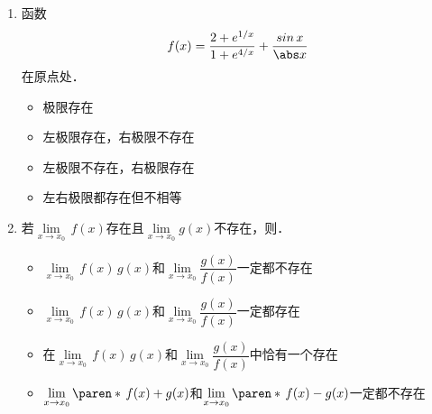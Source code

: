 \documentclass[a4paper,punct=CCT]{ctexbook}
\renewcommand*{\siand}{\shortintertext{和}}
\theoremstyle{definition}
\theoremstyle{remark}
\newif\ifshowsol
\begin{document}
\begin{enumerate}
\item 函数
  \begin{equation*}
    f(x) = \frac{2+e^{1/x}}{1+e^{4/x}} + \frac{\sin x}{\abs x}
  \end{equation*}
  在原点处\uline{\makebox[6em]{}}．
  \begin{itemize}
    \renewcommand{\labelitemi}{\faCircleThin}
    \ifshowsol
  \item[\faCircle]
    \else
  \item
    \fi
    极限存在
  \item 左极限存在，右极限不存在
  \item 左极限不存在，右极限存在
  \item 左右极限都存在但不相等
  \end{itemize}

  \ifshowsol
  实际上，有
  \begin{gather*}
    \lim_{\,x\to0^+} \,f(x)
    = {}\smashoperator[l]{\lim_{\,x\to0^+}} \paren[\bigg]{\frac{2/e^{1/x} + 1}{1/e^{1/x} + e^{3/x}} + \frac{\sin x}{x}}
    = 1
    \siand
    \lim_{\,x\to0^-} \,f(x)
    = {}\smashoperator[l]{\lim_{\,x\to0^-}} \paren[\bigg]{\frac{2+e^{1/x}}{1+e^{4/x}} - \frac{\sin x}{x}}
    = 1.
  \end{gather*}
  所以函数\(f\)在原点处的极限是\(1\)．
  \fi

\item 若\(\lim\limits_{x \to x_0} \,f(x)\)存在且\(\lim\limits_{x \to x_0} g(x)\)不存在，则\uline{\makebox[10em]{}}．
  \begin{itemize}[itemsep=1ex]
    \renewcommand{\labelitemi}{\faCircleThin}
  \item \(\lim\limits_{x \to x_0} \,f(x)\,g(x)\)和\(\lim\limits_{x \to x_0} \dfrac{g(x)}{f(x)}\)一定都不存在
  \item \(\lim\limits_{x \to x_0} \,f(x)\,g(x)\)和\(\lim\limits_{x \to x_0} \dfrac{g(x)}{f(x)}\)一定都存在
  \item 在\(\lim\limits_{x \to x_0} \,f(x)\,g(x)\)和\(\lim\limits_{x \to x_0} \dfrac{g(x)}{f(x)}\)中恰有一个存在
    \ifshowsol
  \item[\faCircle]
    \else
  \item
    \fi
    \(\lim\limits_{x \to x_0} \paren*{\,f(x)+g(x)}\)和\(\lim\limits_{x \to x_0} \paren*{\,f(x)-g(x)}\)一定都不存在
  \end{itemize}

  \ifshowsol
  令\(f(x) = x\)和\(g(x) = 1/x\)，可以证伪选项~A和~B．在此基础上，令\(g(x) = 1/x^2\)，可以证伪选项~C．实际上，在题干的条件下，\(\lim\limits_{x \to x_0} \paren*{\,f(x)+g(x)}\)、\(\lim\limits_{x \to x_0} \paren*{\,f(x)-g(x)}\)和\(\lim\limits_{x \to x_0} \dfrac{g(x)}{f(x)}\)一定都不存在．当\(\lim\limits_{x \to x_0} \,f(x) \ne 0\)时，\(\lim\limits_{x \to x_0} \,f(x)\,g(x)\)一定不存在．当\(\lim\limits_{x \to x_0} \,f(x) = 0\)时，\(\lim\limits_{x \to x_0} \,f(x)\,g(x)\)可能存在也可能不存在．
  \fi


\end{enumerate}
\end{document}
